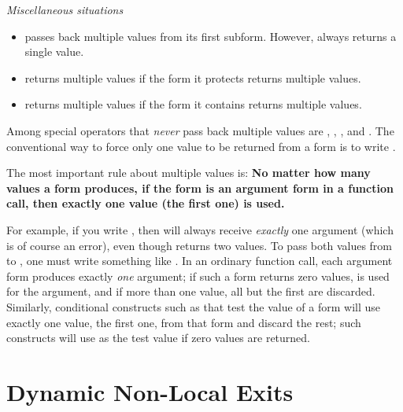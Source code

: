 \begin{flushdesc}
\item[\emph{Miscellaneous situations}]\leavevmode
\begin{itemize}
\item
{} passes back multiple values from its first
subform.  However,  always returns a single value.

\item
{} returns multiple values if the form it protects
returns multiple values.

\item
{} returns multiple values if the form it contains returns
multiple values.
\end{itemize}
\end{flushdesc}

Among special operators that \emph{never} pass back multiple values are
,
, , and .
The conventional way to force only one value to be returned from a form 
is to write .

The most important rule about multiple values is:
\textbf{No matter how many values a form produces,
if the form is an argument form in a function call,
then exactly one value (the first one) is used.}

For example, if you write , then  will always
receive \emph{exactly} one argument (which is of course an error),
even though  returns two values.  To pass both values from 
to , one must write something like
.
In an ordinary function call,
each argument form produces exactly \emph{one} argument;  if such a form
returns zero values, {\false} is used for the argument, and if more than one
value, all but the first are discarded.
Similarly, conditional constructs such as  that test the value of a form
will use exactly one value, the first one, from that form and discard the rest;
such constructs will use {\false} as the test value if zero values are returned.

\section{Dynamic Non-Local Exits}
\label{CATCH-THROW-SECTION}


